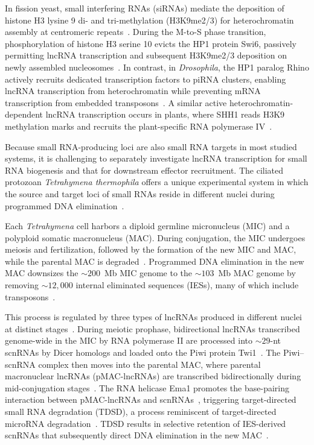 \documentclass[12pt]{article}
\begin{document}
In fission yeast, small interfering RNAs (siRNAs) mediate the deposition of histone H3 lysine 9 di- and tri-methylation (H3K9me2/3) for heterochromatin assembly at centromeric repeats~\citep{Volpe2002, Hall2002}.
During the M-to-S phase transition, phosphorylation of histone H3 serine 10 evicts the HP1 protein Swi6, passively permitting lncRNA transcription and subsequent H3K9me2/3 deposition on newly assembled nucleosomes~\citep{Chen2008, Kloc2008}.
In contrast, in \textit{Drosophila}, the HP1 paralog Rhino actively recruits dedicated transcription factors to piRNA clusters, enabling lncRNA transcription from heterochromatin while preventing mRNA transcription from embedded transposons~\citep{LeThomas2014, Andersen2017}.
A similar active heterochromatin-dependent lncRNA transcription occurs in plants, where SHH1 reads H3K9 methylation marks and recruits the plant-specific RNA polymerase IV~\citep{Law2013, Law2011}.

Because small RNA-producing loci are also small RNA targets in most studied systems, it is challenging to separately investigate lncRNA transcription for small RNA biogenesis and that for downstream effector recruitment.
The ciliated protozoan \textit{Tetrahymena thermophila} offers a unique experimental system in which the source and target loci of small RNAs reside in different nuclei during programmed DNA elimination~\citep{Chalker2013, Noto2017}.

Each \textit{Tetrahymena} cell harbors a diploid germline micronucleus (MIC) and a polyploid somatic macronucleus (MAC).
During conjugation, the MIC undergoes meiosis and fertilization, followed by the formation of the new MIC and MAC, while the parental MAC is degraded~\citep{Chalker2013}.
Programmed DNA elimination in the new MAC downsizes the ${\sim}200$~Mb MIC genome to the ${\sim}103$~Mb MAC genome by removing ${\sim}12{,}000$ internal eliminated sequences (IESs), many of which include transposons~\citep{Noto2017}.

This process is regulated by three types of lncRNAs produced in different nuclei at distinct stages~\citep{Aronica2008, Schoeberl2011}.
During meiotic prophase, bidirectional lncRNAs transcribed genome-wide in the MIC by RNA polymerase II are processed into ${\sim}29$-nt scnRNAs by Dicer homologs and loaded onto the Piwi protein Twi1~\citep{Chalker2001, Schoeberl2012, Mochizuki2004b, Malone2005, Mochizuki2005, Mochizuki2002, Noto2010}.
The Piwi--scnRNA complex then moves into the parental MAC, where parental macronuclear lncRNAs (pMAC-lncRNAs) are transcribed bidirectionally during mid-conjugation stages~\citep{Woo2016}.
The RNA helicase Ema1 promotes the base-pairing interaction between pMAC-lncRNAs and scnRNAs~\citep{Aronica2008}, triggering target-directed small RNA degradation (TDSD), a process reminiscent of target-directed microRNA degradation~\citep{Han2023}.
TDSD results in selective retention of IES-derived scnRNAs that subsequently direct DNA elimination in the new MAC~\citep{Aronica2008, Schoeberl2012, Mochizuki2004a, Noto2015, Noto2018}.
\end{document}
